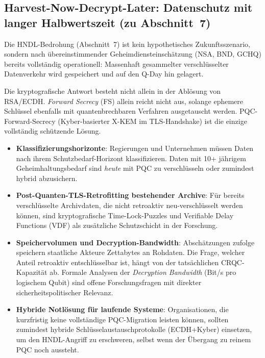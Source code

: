 ﻿\documentclass[a4paper,12pt]{article}
\theoremstyle{definition}
\begin{document}
\subsection{Harvest-Now-Decrypt-Later: Datenschutz mit langer Halbwertszeit (zu Abschnitt~7)}

Die HNDL-Bedrohung (Abschnitt~7) ist kein hypothetisches
Zukunftsszenario, sondern nach übereinstimmender
Geheimdiensteinschätzung (NSA, BND, GCHQ) bereits vollständig
operationell: Massenhaft gesammelter verschlüsselter Datenverkehr
wird gespeichert und auf den Q-Day hin gelagert.

Die kryptografische Antwort besteht nicht allein in der Ablösung
von RSA/ECDH. \emph{Forward Secrecy} (FS) allein reicht nicht aus,
solange ephemere Schlüssel ebenfalls mit quantenbrechbaren Verfahren
ausgetauscht werden. PQC-Forward-Secrecy (Kyber-basierter X-KEM im
TLS-Handshake) ist die einzige vollständig schützende Lösung.

\begin{itemize}
  \item \textbf{Klassifizierungshorizonte}: Regierungen und Unternehmen
    müssen Daten nach ihrem Schutzbedarf-Horizont klassifizieren.
    Daten mit 10+ jährigem Geheimhaltungsbedarf sind \emph{heute}
    mit PQC zu verschlüsseln oder zumindest hybrid abzusichern.
  \item \textbf{Post-Quanten-TLS-Retrofitting bestehender Archive}:
    Für bereits verschlüsselte Archivdaten, die nicht retroaktiv
    neu-verschlüsselt werden können, sind kryptografische
    Time-Lock-Puzzles und Verifiable Delay Functions (VDF) als
    zusätzliche Schutzschicht in der Forschung.
  \item \textbf{Speichervolumen und Decryption-Bandwidth}:
    Abschätzungen zufolge speichern staatliche Akteure Zettabytes
    an Rohdaten. Die Frage, welcher Anteil retroaktiv entschlüsselbar
    ist, hängt von der tatsächlichen CRQC-Kapazität ab. Formale
    Analysen der \emph{Decryption Bandwidth} (Bit/s pro logischem Qubit)
    sind offene Forschungsfragen mit direkter sicherheitspolitischer
    Relevanz.
  \item \textbf{Hybride Notlösung für laufende Systeme}:
    Organisationen, die kurzfristig keine vollständige
    PQC-Migration leisten können, sollten zumindest
    hybride Schlüsselaustauschprotokolle (ECDH+Kyber) einsetzen,
    um den HNDL-Angriff zu erschweren, selbst wenn der
    Übergang zu reinem PQC noch aussteht.
\end{itemize}
\end{document}
